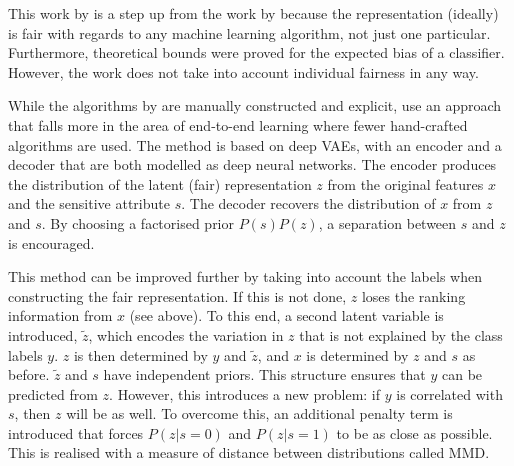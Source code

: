 
This work by \citet{feldman2015certifying} is a step up from the work by \citet{zemel2013learning}
because the representation (ideally) is fair with regards to any machine learning algorithm, not just one particular.
Furthermore, theoretical bounds were proved for the expected bias of a classifier.
However, the work does not take into account individual fairness in any way.

While the algorithms by \citet{feldman2015certifying} are manually constructed and explicit,
\citet{louizos2016variational} use an approach
that falls more in the area of end-to-end learning where fewer hand-crafted algorithms are used.
The method is based on deep \acp{VAE},
with an encoder and a decoder that are both modelled as deep neural networks.
The encoder produces the distribution of the latent (fair) representation \(z\)
from the original features \(x\) and the sensitive attribute \(s\).
The decoder recovers the distribution of \(x\) from \(z\) and \(s\).
By choosing a factorised prior \(P(s)P(z)\), a separation between \(s\) and \(z\) is encouraged.

This method can be improved further by taking into account the labels
when constructing the fair representation.
If this is not done, \(z\) loses the ranking information from \(x\) (see \citet{feldman2015certifying} above).
To this end, a second latent variable is introduced, \(\tilde{z}\),
which encodes the variation in \(z\) that is not explained by the class labels \(y\).
\(z\) is then determined by \(y\) and \(\tilde{z}\),
and \(x\) is determined by \(z\) and \(s\) as before.
\(\tilde{z}\) and \(s\) have independent priors.
This structure ensures that \(y\) can be predicted from \(z\).
However, this introduces a new problem:
if \(y\) is correlated with \(s\), then \(z\) will be as well.
To overcome this, an additional penalty term is introduced that forces \(P(z|s=0)\)
and \(P(z|s=1)\) to be as close as possible.
This is realised with a measure of distance between distributions called \acf{MMD}.

